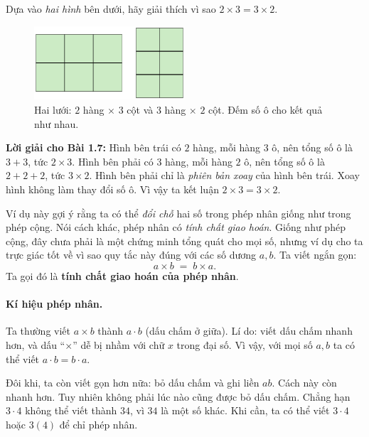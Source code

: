 \begin{problem}[1.7]
Dựa vào \emph{hai hình} bên dưới, hãy giải thích vì sao \(2\times3=3\times2\).

\begin{figure}[ht!]
  \centering
  \includegraphics[width=0.50\textwidth]{img/fig-prob1.7.pdf}
  \caption*{\small Hai lưới: \(2\) hàng \(\times\) \(3\) cột và \(3\) hàng \(\times\) \(2\) cột.
  Đếm số ô cho kết quả như nhau.}
\end{figure}
\end{problem}

\noindent\textbf{Lời giải cho Bài 1.7:}  
Hình bên trái có \(2\) hàng, mỗi hàng \(3\) ô, nên tổng số ô là \(3+3\),
tức \(2\times3\).  
Hình bên phải có \(3\) hàng, mỗi hàng \(2\) ô, nên tổng số ô là \(2+2+2\),
tức \(3\times2\).  
Hình bên phải chỉ là \emph{phiên bản xoay} của hình bên trái. Xoay hình
không làm thay đổi số ô. Vì vậy ta kết luận \(2\times3=3\times2\).

Ví dụ này gợi ý rằng ta có thể \emph{đổi chỗ} hai số trong phép nhân
giống như trong phép cộng. Nói cách khác, phép nhân có \emph{tính chất
giao hoán}. Giống như phép cộng, đây chưa phải là một chứng minh tổng
quát cho mọi số, nhưng ví dụ cho ta trực giác tốt về vì sao quy tắc này
đúng với các số dương \(a,b\). Ta viết ngắn gọn:
\[
a\times b \;=\; b\times a.
\]
Ta gọi đó là \textbf{tính chất giao hoán của phép nhân}.


\paragraph{Kí hiệu phép nhân.}
Ta thường viết \(a\times b\) thành \(a\cdot b\) (dấu chấm ở giữa).
Lí do: viết dấu chấm nhanh hơn, và dấu “\(\times\)” dễ bị nhầm với
chữ \(x\) trong đại số. Vì vậy, với mọi số \(a,b\) ta có thể viết
\(a\cdot b=b\cdot a\).

Đôi khi, ta còn viết gọn hơn nữa: bỏ dấu chấm và ghi liền \(ab\).
Cách này còn nhanh hơn. Tuy nhiên không phải lúc nào cũng được bỏ
dấu chấm. Chẳng hạn \(3\cdot4\) không thể viết thành \(34\), vì
\(34\) là một số khác. Khi cần, ta có thể viết \(3\cdot4\) hoặc
\(3(4)\) để chỉ phép nhân.

